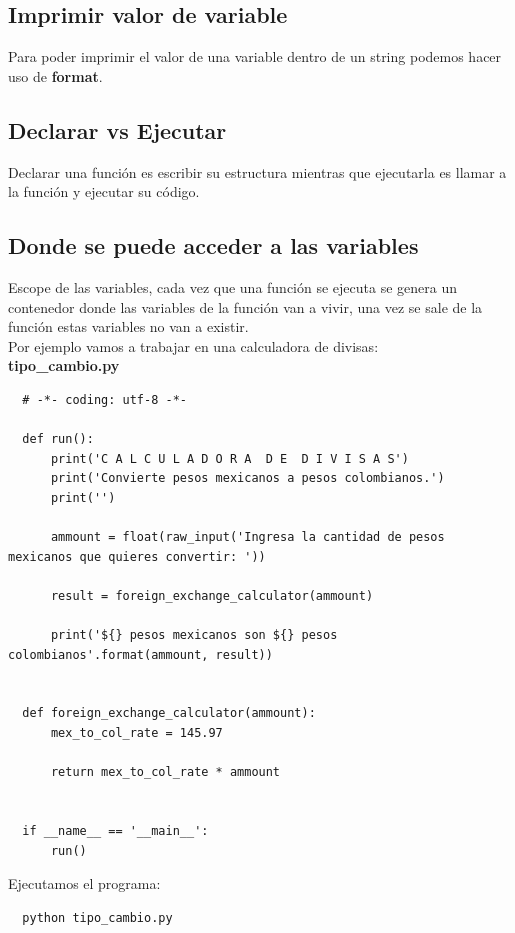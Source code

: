 \documentclass{article}
\begin{document}
\subsection{Imprimir valor de variable}%
Para poder imprimir el valor de una variable dentro de un string podemos hacer
uso de \textbf{format}.

\subsection{Declarar vs Ejecutar}%
Declarar una función es escribir su estructura mientras que ejecutarla es
llamar a la función y ejecutar su código.

\subsection{Donde se puede acceder a las variables}%
Escope de las variables, cada vez que una función se ejecuta se genera un
contenedor donde las variables de la función van a vivir, una vez se sale de la
función estas variables no van a existir.\\

Por ejemplo vamos a trabajar en una calculadora de divisas:\\

\textbf{tipo\_cambio.py}
\begin{verbatim}
  # -*- coding: utf-8 -*-

  def run():
      print('C A L C U L A D O R A  D E  D I V I S A S')
      print('Convierte pesos mexicanos a pesos colombianos.')
      print('')

      ammount = float(raw_input('Ingresa la cantidad de pesos mexicanos que quieres convertir: '))

      result = foreign_exchange_calculator(ammount)

      print('${} pesos mexicanos son ${} pesos colombianos'.format(ammount, result))


  def foreign_exchange_calculator(ammount):
      mex_to_col_rate = 145.97

      return mex_to_col_rate * ammount


  if __name__ == '__main__':
      run()
\end{verbatim}

Ejecutamos el programa:

\begin{verbatim}
  python tipo_cambio.py
\end{verbatim}
\end{document}
